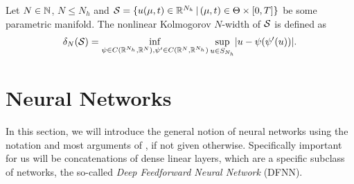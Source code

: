 \begin{definition} \label{def: nonlinear kolmogorov}
    Let $N \in \mathbb{N}$, $N \leq N_h$ and $\mathcal{S}= \{ u(\mu, t) \in \mathbb{R}^{N_h} \, 
    \vert \, (\mu, t) \in \Theta \times [0, T] \}$ 
    be some parametric manifold. The nonlinear Kolmogorov $N$-width of $\mathcal{S}$ is defined as 
    \begin{equation*}
        \delta_N(\mathcal{S}) =\underset{\psi \in C(\mathbb{R}^{N_h}, \mathbb{R}^N),\\ \psi' \in C(\mathbb{R}^N, \mathbb{R}^{N_h})}{\inf} 
        \sup\limits_{u \in S_{N_h}} \lvert u - \psi(\psi'(u)) \rvert.
    \end{equation*}
\end{definition}





\section{Neural Networks} \label{section: background for nn}

In this section, we will introduce the general notion of neural networks using the notation
and most arguments of \cite{gühring2019nn}, if not given otherwise. Specifically important for us will be 
concatenations of dense linear layers, which are a specific subclass of networks, the so-called 
\emph{Deep Feedforward Neural Network} (DFNN).

